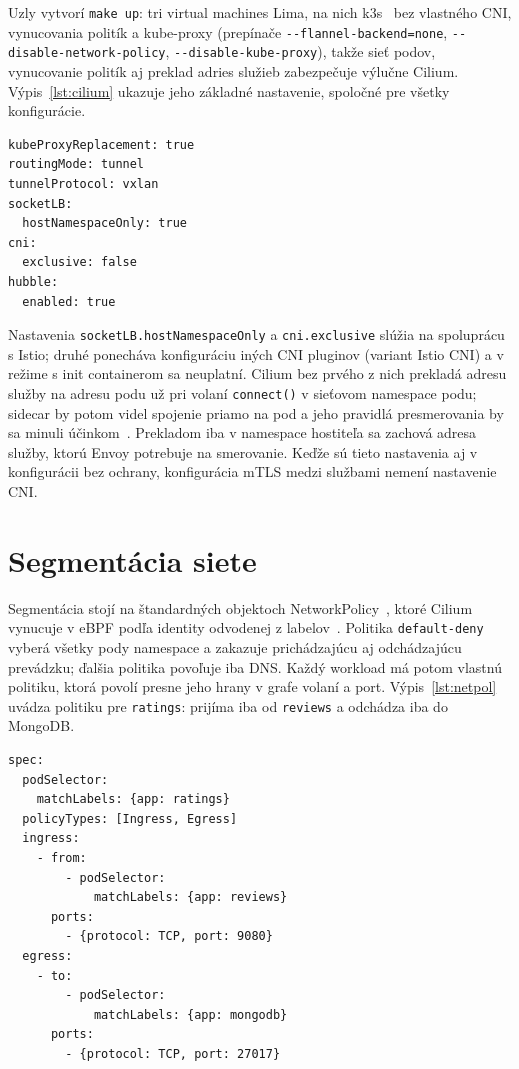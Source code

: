 Uzly vytvorí \texttt{make up}: tri virtual machines Lima, na nich k3s~\cite{k3s} bez vlastného CNI, vynucovania politík a kube-proxy (prepínače \texttt{-{}-flannel-backend=none}, \texttt{-{}-disable-network-policy}, \texttt{-{}-disable-kube-proxy}), takže sieť podov, vynucovanie politík aj preklad adries služieb zabezpečuje výlučne Cilium. Výpis~\ref{lst:cilium} ukazuje jeho základné nastavenie, spoločné pre všetky konfigurácie.

\begin{lstlisting}[language={},basicstyle=\ttfamily\footnotesize,caption={Základné nastavenie Cilium (výňatok)},label={lst:cilium}]
kubeProxyReplacement: true
routingMode: tunnel
tunnelProtocol: vxlan
socketLB:
  hostNamespaceOnly: true
cni:
  exclusive: false
hubble:
  enabled: true
\end{lstlisting}

Nastavenia \texttt{socketLB.hostNamespaceOnly} a \texttt{cni.exclusive} slúžia na spoluprácu s Istio; druhé ponecháva konfiguráciu iných CNI pluginov (variant Istio CNI) a v režime s init containerom sa neuplatní. Cilium bez prvého z nich prekladá adresu služby na adresu podu už pri volaní \texttt{connect()} v sieťovom namespace podu; sidecar by potom videl spojenie priamo na pod a jeho pravidlá presmerovania by sa minuli účinkom~\cite{cilium-kpr}. Prekladom iba v namespace hostiteľa sa zachová adresa služby, ktorú Envoy potrebuje na smerovanie. Keďže sú tieto nastavenia aj v konfigurácii bez ochrany, konfigurácia mTLS medzi službami nemení nastavenie CNI.

\section{Segmentácia siete}

Segmentácia stojí na štandardných objektoch NetworkPolicy~\cite{k8s-networkpolicy}, ktoré Cilium vynucuje v eBPF podľa identity odvodenej z labelov~\cite{cilium-identity}. Politika \texttt{default-deny} vyberá všetky pody namespace a zakazuje prichádzajúcu aj odchádzajúcu prevádzku; ďalšia politika povoľuje iba DNS. Každý workload má potom vlastnú politiku, ktorá povolí presne jeho hrany v grafe volaní a port. Výpis~\ref{lst:netpol} uvádza politiku pre \texttt{ratings}: prijíma iba od \texttt{reviews} a odchádza iba do MongoDB.

\begin{lstlisting}[language={},basicstyle=\ttfamily\footnotesize,caption={NetworkPolicy pre \texttt{ratings}},label={lst:netpol}]
spec:
  podSelector:
    matchLabels: {app: ratings}
  policyTypes: [Ingress, Egress]
  ingress:
    - from:
        - podSelector:
            matchLabels: {app: reviews}
      ports:
        - {protocol: TCP, port: 9080}
  egress:
    - to:
        - podSelector:
            matchLabels: {app: mongodb}
      ports:
        - {protocol: TCP, port: 27017}
\end{lstlisting}

